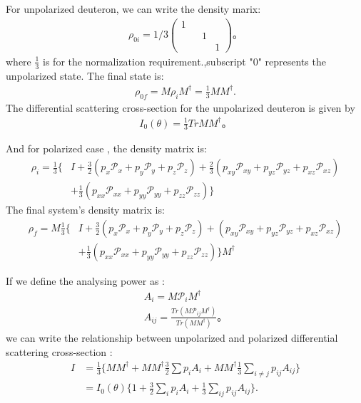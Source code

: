 \documentclass[twocolumn,twoside,showpacs,preprintnumbers,superscriptaddress,amsmath,amssymb,prc]{revtex4}
\begin{document}
For unpolarized deuteron, we can write the density marix:
\begin{align}
        \rho_{0i} = 1/3 \begin{pmatrix}
            1& & &\\
            & &1 & \\
            & & &1
        \end{pmatrix}。
\end{align}
where $\frac{1}{3}$ is for the normalization requirement.,subscript "0" represents the unpolarized state.
The final state is:
\begin{align}
    \rho_{0f} = M \rho_i M^\dagger =\frac{1}{3} M M^\dagger.
\end{align}
The differential scattering cross-section for the unpolarized deuteron is given by
\begin{align}
    I_0(\theta) =\frac{1}{3} Tr M M^\dagger。
\end{align}

And for polarized case , the density matrix is:
\begin{align}
  \rho_i =           \frac{1}{3} \{
  & I + \frac{3}{2} \left( p_x \mathcal{P}_x + p_y \mathcal{P}_y + p_z \mathcal{P}_z \right) + 
  \frac{2}{3} 
  \left( 
  p_{xy} 
  \mathcal{P}_{xy} + 
  p_{yz} \mathcal{P}_{yz} + p_{xz} \mathcal{P}_{xz} 
  \right) 
 \\ \nonumber
  & + 
  \frac{1}{3} ( p_{xx} \mathcal{P}_{xx} + p_{yy} \mathcal{P}_{yy} +p_{zz} \mathcal{P}_{zz} )
  \}
\end{align}
The final system's density matrix is:
\begin{align}
  \rho_f =M \frac{1}{3} \{
  & I + \frac{3}{2} \left( p_x \mathcal{P}_x + p_y \mathcal{P}_y + p_z \mathcal{P}_z \right) + 
  \left( 
  p_{xy} 
  \mathcal{P}_{xy} + 
  p_{yz} \mathcal{P}_{yz} + p_{xz} \mathcal{P}_{xz} 
  \right) 
 \\ \nonumber
  &+ 
  \frac{1}{3} ( p_{xx} \mathcal{P}_{xx} + p_{yy} \mathcal{P}_{yy} +p_{zz} \mathcal{P}_{zz} )
  \} M^\dagger
\end{align}

If we define the analysing power as :
\begin{align}
    A_i = M \mathcal{P}_i M^\dagger \\
    A_{ij} = \frac{Tr (M \mathcal{P}_{ij} M^\dagger)}{Tr(MM^\dagger)}。
\end{align}
we can write the relationship between unpolarized and polarized differential scattering cross-section :
\begin{align}
    I&= \frac{1}{3} \{ MM^\dagger + MM^\dagger \frac{3}{2} \sum p_i A_i   + MM^\dagger \frac{1}{3}\sum_{i \neq j} p_{ij}A_{ij}  \} \\ \nonumber
    &= I_0(\theta) \{ 1 + \frac{3}{2} \sum_i p_i A_i  + \frac{1}{3} \sum_{ij} p_{ij} A_{ij}\}.
\end{align}
\end{document}
